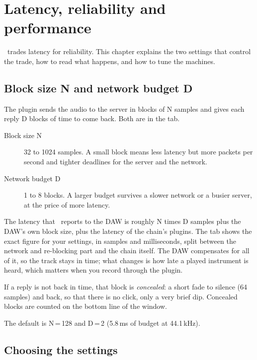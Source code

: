 \chapter{Latency, reliability and performance}
\label{ch:performance}

\fxme\ trades latency for reliability. This chapter explains the two
settings that control the trade, how to read what happens, and how to tune
the machines.

\section{Block size N and network budget D}

The plugin sends the audio to the server in blocks of N samples and gives
each reply D blocks of time to come back. Both are in the 
tab.

\begin{description}
  \item[Block size N] 32 to 1024 samples. A small block means less latency
    but more packets per second and tighter deadlines for the server and
    the network.
  \item[Network budget D] 1 to 8 blocks. A larger budget survives a slower
    network or a busier server, at the price of more latency.
\end{description}

The latency that \fxme\ reports to the DAW is roughly N times D samples
plus the DAW's own block size, plus the latency of the chain's plugins. The
 tab shows the exact figure for your settings, in samples and
milliseconds, split between the network and re-blocking part and the chain
itself. The DAW compensates for all of it, so the track stays in time; what
changes is how late a played instrument is heard, which matters when you
record through the plugin.

If a reply is not back in time, that block is \emph{concealed}: a short fade
to silence (64 samples) and back, so that there is no click, only a
very brief dip. Concealed blocks are counted on the bottom line of the
window.

The default is N\,=\,128 and D\,=\,2 (5.8\,ms of budget at 44.1\,kHz).

\section{Choosing the settings}


